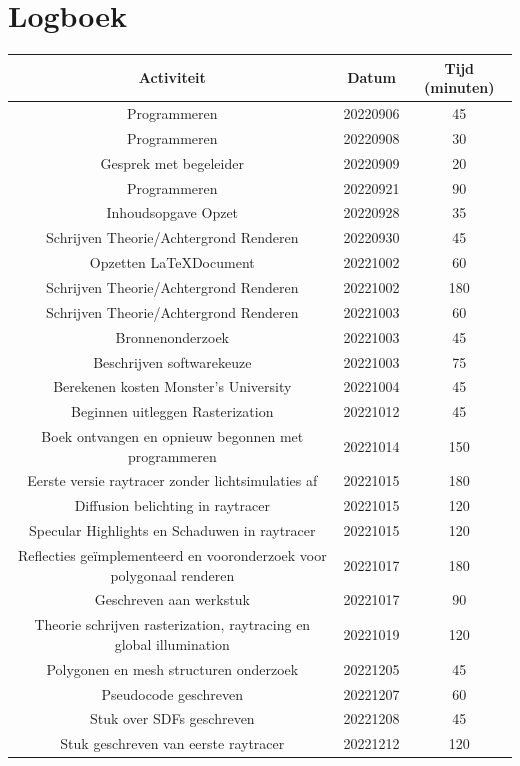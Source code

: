 \documentclass[12pt, a4paper]{article}
\begin{document}
\section{Logboek}
\begin{table}[!htp]\centering
	\scriptsize
	\begin{tabular}{| c c c |}
		\hline
		\textbf{Activiteit} &\textbf{Datum} &\textbf{Tijd (minuten)} \\
		\hline
		Programmeren &20220906 &45 \\
		Programmeren &20220908 &30 \\
		Gesprek met begeleider &20220909 &20 \\
		Programmeren &20220921 &90 \\
		Inhoudsopgave Opzet &20220928 &35 \\
		Schrijven Theorie/Achtergrond Renderen &20220930 &45 \\
		Opzetten \LaTeX Document &20221002 &60 \\
		Schrijven Theorie/Achtergrond Renderen &20221002 &180 \\
		Schrijven Theorie/Achtergrond Renderen &20221003 &60 \\
		Bronnenonderzoek &20221003 &45 \\
		Beschrijven softwarekeuze &20221003 &75 \\
		Berekenen kosten Monster's University &20221004 &45 \\
		Beginnen uitleggen Rasterization &20221012 &45 \\
		Boek ontvangen en opnieuw begonnen met programmeren &20221014 &150 \\
		Eerste versie raytracer zonder lichtsimulaties af &20221015 &180 \\
		Diffusion belichting in raytracer &20221015 &120 \\
		Specular Highlights en Schaduwen in raytracer &20221015 &120 \\
		Reflecties geïmplementeerd en vooronderzoek voor polygonaal renderen &20221017 &180 \\
		Geschreven aan werkstuk &20221017 &90 \\
		Theorie schrijven rasterization, raytracing en global illumination &20221019 &120 \\
		Polygonen en mesh structuren onderzoek &20221205 &45 \\
		Pseudocode geschreven &20221207 &60 \\
		Stuk over SDFs geschreven &20221208 &45 \\
		Stuk geschreven van eerste raytracer &20221212 &120 \\

\end{tabular}
\end{table}
\end{document}
